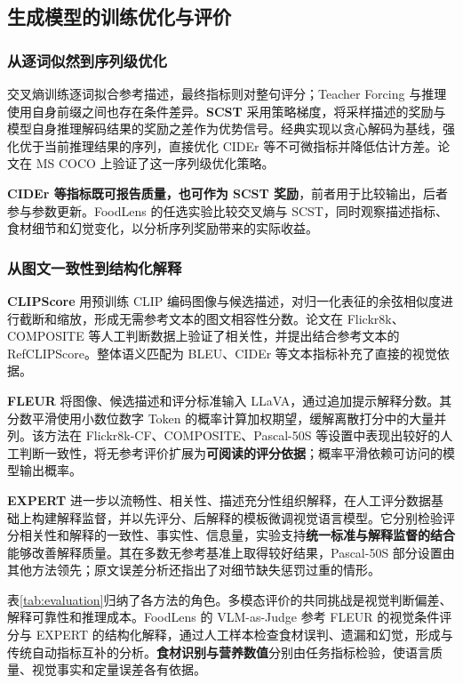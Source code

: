 \FloatBarrier
\subsection{生成模型的训练优化与评价}
\label{subsec:optimization-evaluation}

\subsubsection{从逐词似然到序列级优化}
交叉熵训练逐词拟合参考描述，最终指标则对整句评分；Teacher Forcing 与推理使用自身前缀之间也存在条件差异。\textbf{SCST}\cite{rennie2017scst} 采用策略梯度，将采样描述的奖励与模型自身推理解码结果的奖励之差作为优势信号。经典实现以贪心解码为基线，强化优于当前推理结果的序列，直接优化 CIDEr 等不可微指标并降低估计方差。论文在 MS COCO 上验证了这一序列级优化策略。

\textbf{CIDEr 等指标既可报告质量，也可作为 SCST 奖励}，前者用于比较输出，后者参与参数更新。FoodLens 的任选实验比较交叉熵与 SCST，同时观察描述指标、食材细节和幻觉变化，以分析序列奖励带来的实际收益。

\subsubsection{从图文一致性到结构化解释}
\textbf{CLIPScore}\cite{hessel2021clipscore} 用预训练 CLIP 编码图像与候选描述，对归一化表征的余弦相似度进行截断和缩放，形成无需参考文本的图文相容性分数。论文在 Flickr8k、COMPOSITE 等人工判断数据上验证了相关性，并提出结合参考文本的 RefCLIPScore。整体语义匹配为 BLEU、CIDEr 等文本指标补充了直接的视觉依据。

\textbf{FLEUR}\cite{lee2024fleur} 将图像、候选描述和评分标准输入 LLaVA，通过追加提示解释分数。其分数平滑使用小数位数字 Token 的概率计算加权期望，缓解离散打分中的大量并列。该方法在 Flickr8k-CF、COMPOSITE、Pascal-50S 等设置中表现出较好的人工判断一致性，将无参考评价扩展为\textbf{可阅读的评分依据}；概率平滑依赖可访问的模型输出概率。

\textbf{EXPERT}\cite{kim2025expert} 进一步以流畅性、相关性、描述充分性组织解释，在人工评分数据基础上构建解释监督，并以先评分、后解释的模板微调视觉语言模型。它分别检验评分相关性和解释的一致性、事实性、信息量，实验支持\textbf{统一标准与解释监督的结合}能够改善解释质量。其在多数无参考基准上取得较好结果，Pascal-50S 部分设置由其他方法领先；原文误差分析还指出了对细节缺失惩罚过重的情形。

表\ref{tab:evaluation}归纳了各方法的角色。多模态评价的共同挑战是视觉判断偏差、解释可靠性和推理成本。FoodLens 的 VLM-as-Judge 参考 FLEUR 的视觉条件评分与 EXPERT 的结构化解释，通过人工样本检查食材误判、遗漏和幻觉，形成与传统自动指标互补的分析。\textbf{食材识别与营养数值}分别由任务指标检验，使语言质量、视觉事实和定量误差各有依据。

